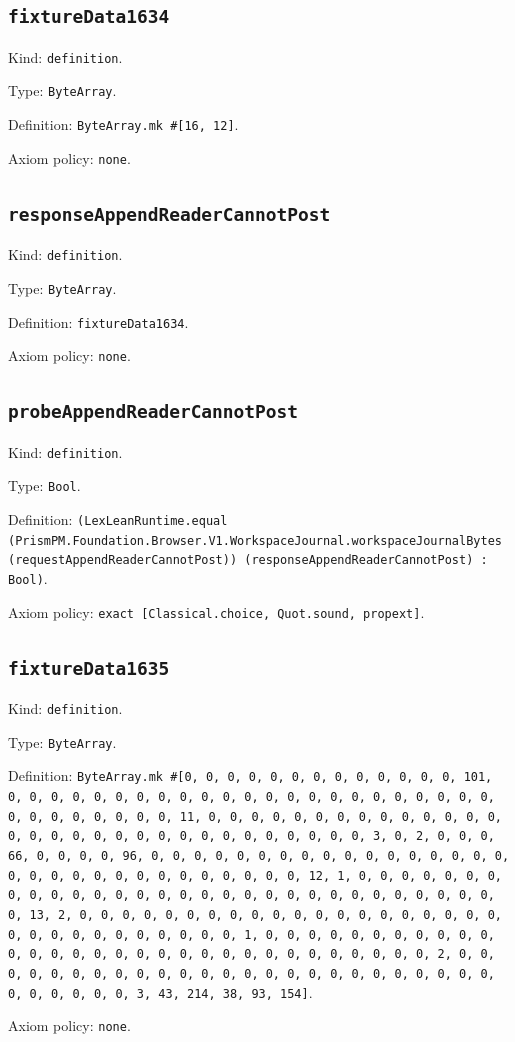 \documentclass[11pt]{article}
\begin{document}
\subsection*{\texttt{fixtureData1634}}
\noindent Kind: \texttt{definition}.\par
\noindent Type: \texttt{ByteArray}.\par
\noindent Definition: \texttt{ByteArray.mk \#[16, 12]}.\par
\noindent Axiom policy: \texttt{none}.\par
\subsection*{\texttt{responseAppendReaderCannotPost}}
\noindent Kind: \texttt{definition}.\par
\noindent Type: \texttt{ByteArray}.\par
\noindent Definition: \texttt{fixtureData1634}.\par
\noindent Axiom policy: \texttt{none}.\par
\subsection*{\texttt{probeAppendReaderCannotPost}}
\noindent Kind: \texttt{definition}.\par
\noindent Type: \texttt{Bool}.\par
\noindent Definition: \texttt{(LexLeanRuntime.equal (PrismPM.Foundation.Browser.V1.WorkspaceJournal.workspaceJournalBytes (requestAppendReaderCannotPost)) (responseAppendReaderCannotPost) : Bool)}.\par
\noindent Axiom policy: \texttt{exact [Classical.choice, Quot.sound, propext]}.\par
\subsection*{\texttt{fixtureData1635}}
\noindent Kind: \texttt{definition}.\par
\noindent Type: \texttt{ByteArray}.\par
\noindent Definition: \texttt{ByteArray.mk \#[0, 0, 0, 0, 0, 0, 0, 0, 0, 0, 0, 0, 0, 101, 0, 0, 0, 0, 0, 0, 0, 0, 0, 0, 0, 0, 0, 0, 0, 0, 0, 0, 0, 0, 0, 0, 0, 0, 0, 0, 0, 0, 0, 0, 0, 11, 0, 0, 0, 0, 0, 0, 0, 0, 0, 0, 0, 0, 0, 0, 0, 0, 0, 0, 0, 0, 0, 0, 0, 0, 0, 0, 0, 0, 0, 0, 0, 3, 0, 2, 0, 0, 0, 66, 0, 0, 0, 0, 96, 0, 0, 0, 0, 0, 0, 0, 0, 0, 0, 0, 0, 0, 0, 0, 0, 0, 0, 0, 0, 0, 0, 0, 0, 0, 0, 0, 0, 0, 0, 0, 12, 1, 0, 0, 0, 0, 0, 0, 0, 0, 0, 0, 0, 0, 0, 0, 0, 0, 0, 0, 0, 0, 0, 0, 0, 0, 0, 0, 0, 0, 0, 0, 0, 13, 2, 0, 0, 0, 0, 0, 0, 0, 0, 0, 0, 0, 0, 0, 0, 0, 0, 0, 0, 0, 0, 0, 0, 0, 0, 0, 0, 0, 0, 0, 0, 0, 1, 0, 0, 0, 0, 0, 0, 0, 0, 0, 0, 0, 0, 0, 0, 0, 0, 0, 0, 0, 0, 0, 0, 0, 0, 0, 0, 0, 0, 0, 0, 0, 2, 0, 0, 0, 0, 0, 0, 0, 0, 0, 0, 0, 0, 0, 0, 0, 0, 0, 0, 0, 0, 0, 0, 0, 0, 0, 0, 0, 0, 0, 0, 0, 3, 43, 214, 38, 93, 154]}.\par
\noindent Axiom policy: \texttt{none}.\par
\end{document}
